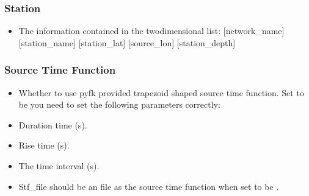 \documentclass[a4paper,10pt,english,openany]{sphinxmanual}
\begin{document}
\subsubsection{Station}
\label{\detokenize{tutorials/S2_Syn_Waveform:station}}
\begin{itemize}
\item {} 
The information contained in the two\sphinxhyphen{}dimensional list: {[}network\_name{]} {[}station\_name{]}  {[}station\_lat{]}   {[}source\_lon{]}    {[}station\_depth{]}

\end{itemize}


\subsubsection{Source Time Function}
\label{\detokenize{tutorials/S2_Syn_Waveform:source-time-function}}
\begin{itemize}
\item {} 
Whether to use pyfk provided trapezoid shaped source time function. Set to be  you need to set the following parameters correctly:


\end{itemize}

\begin{itemize}
\item {} 
Duration time (s).

\end{itemize}

\begin{itemize}
\item {} 
Rise time (s).

\end{itemize}

\begin{itemize}
\item {} 
The time interval (s).

\end{itemize}

\begin{itemize}
\item {} 
Stf\_file should be an  file as the source time function when set  to be .

\end{itemize}
\end{document}
